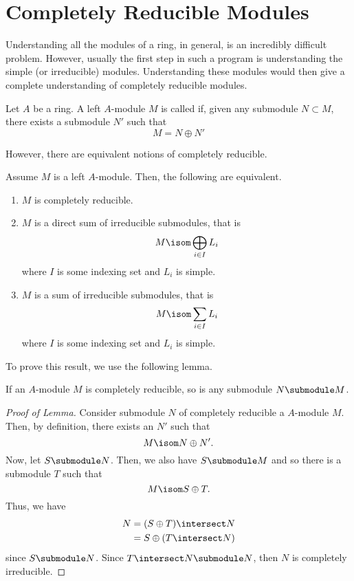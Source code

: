 \documentclass[11pt,leqno,oneside]{amsbook}
\numberwithin{thm}{section}
\begin{document}
\section{Completely Reducible Modules}
Understanding all the modules of a ring, in general, is an incredibly
difficult problem. However, usually the first step in such a program
is understanding the simple (or irreducible) modules. Understanding
these modules would then give a complete understanding of completely
reducible modules.
\begin{defn}
  Let \(A\) be a ring. A left \(A\)-module \(M\) is called
   if, given any submodule \(N \subset M\),
  there exists a submodule \(N'\) such that \[
    M = N \oplus N'
  \]
\end{defn}
However, there are equivalent notions of completely reducible.
\begin{thm}
  Assume \(M\) is a left \(A\)-module. Then, the following are
  equivalent.
  \begin{enumerate}
  \item \(M\) is completely reducible.
  \item \(M\) is a direct sum of irreducible submodules, that is \[
      M \isom \bigoplus_{i \in I} L_i
    \]
    where \(I\) is some indexing set and \(L_i\) is simple.
  \item \(M\) is a sum of irreducible submodules, that is \[
      M \isom \sum_{i \in I} L_i
    \]
    where \(I\) is some indexing set and \(L_i\) is simple.
  \end{enumerate}
\end{thm}
To prove this result, we use the following lemma.
\begin{lem}
  If an \(A\)-module \(M\) is completely reducible, so is any
  submodule \(N \submodule M\).
\end{lem}
\begin{proof}[Proof of Lemma]
  Consider submodule \(N\) of completely reducible a \(A\)-module
  \(M\). Then, by definition, there exists an \(N'\) such that \[
    M \isom N \oplus N'.
  \]
  Now, let \(S \submodule N\). Then, we also have \(S \submodule M\)
  and so there is a submodule \(T\) such that \[
    M \isom S \oplus T.
  \]
  Thus, we have
  \begin{align*}
    N & = (S \oplus T) \intersect N \\
      & = S \oplus (T \intersect N)
  \end{align*}
  since \(S \submodule N\). Since \(T \intersect N \submodule N\),
  then \(N\) is completely irreducible.
\end{proof}
\end{document}
